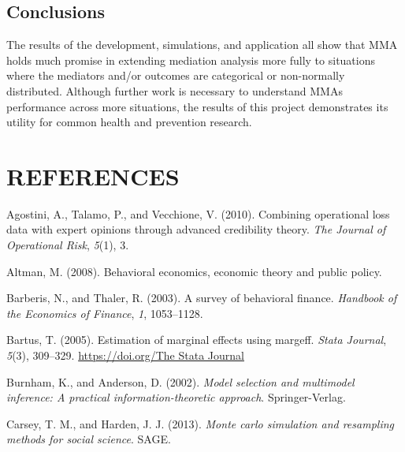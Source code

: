 \documentclass[]{DissertateUSU}
\begin{document}
\section{Conclusions}\label{conclusions-3}

The results of the development, simulations, and application all show
that MMA holds much promise in extending mediation analysis more fully
to situations where the mediators and/or outcomes are categorical or
non-normally distributed. Although further work is necessary to
understand MMAs performance across more situations, the results of this
project demonstrates its utility for common health and prevention
research.

\singlespacing

\FloatBarrier

\newpage

 \fancyhead[R]{\thepage} \fancyfoot[C]{}

\chapter*{REFERENCES}

\setlength{\parindent}{-0.5in} \setlength{\leftskip}{0.4in}
\setlength{\parskip}{6pt} \noindent

\hypertarget{refs}{}
\hypertarget{ref-agostini2010combining}{}
Agostini, A., Talamo, P., and Vecchione, V. (2010). Combining
operational loss data with expert opinions through advanced credibility
theory. \emph{The Journal of Operational Risk}, \emph{5}(1), 3.

\hypertarget{ref-altman2008behavioral}{}
Altman, M. (2008). Behavioral economics, economic theory and public
policy.

\hypertarget{ref-barberis2003survey}{}
Barberis, N., and Thaler, R. (2003). A survey of behavioral finance.
\emph{Handbook of the Economics of Finance}, \emph{1}, 1053--1128.

\hypertarget{ref-Bartus2005}{}
Bartus, T. (2005). Estimation of marginal effects using margeff.
\emph{Stata Journal}, \emph{5}(3), 309--329.
\href{https://doi.org/The\%20Stata\%20Journal}{https://doi.org/The Stata Journal}

\hypertarget{ref-Burnham2002}{}
Burnham, K., and Anderson, D. (2002). \emph{Model selection and
multimodel inference: A practical information-theoretic approach}.
Springer-Verlag.

\hypertarget{ref-Carsey2013}{}
Carsey, T. M., and Harden, J. J. (2013). \emph{Monte carlo simulation
and resampling methods for social science}. SAGE.
\end{document}
